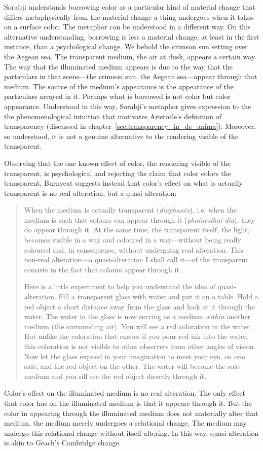Sorabji understands borrowing color as a particular kind of material change that differs metaphysically from the material change a thing undergoes when it takes on a surface color. The metaphor can be understood in a different way. On this alternative understanding, borrowing is less a material change, at least in the first instance, than a psychological change. We behold the crimson sun setting over the Aegean sea. The transparent medium, the air at dusk, appears a certain way. The way that the illuminated medium appears is due to the way that the particulars in that scene---the crimson sun, the Aegean sea---appear through that medium. The source of the medium's appearance is the appearance of the particulars arrayed in it. Perhaps what is borrowed is not color but color appearance. Understood in this way, Sorabji's metaphor gives expression to the the phenomenological intuition that motivates Aristotle's definition of transparency (discussed in chapter~\ref{sec:transparency_in_de_anima}). Moreover, so understood, it is not a genuine alternative to the rendering visible of the transparent.

Observing that the one known effect of color, the rendering visible of the transparent, is psychological and rejecting the claim that color colors the transparent, Burnyeat suggests instead that color's effect on what is actually transparent is no real alteration, but a quasi-alteration:
\begin{quotation}
	\noindent When the medium is actually transparent (\emph{diaphanēs}), i.e. when the medium is such that colours can appear through it (\emph{phainesthai dia}), they do appear through it. At the same time, the transparent itself, the light, becomes visible in a way and coloured in a way---without being really coloured and, in consequence, without undergoing real alteration. This non-real alteration---a quasi-alteration I shall call it---of the transparent consists in the fact that colours appear through it.
	
	Here is a little experiment to help you understand the idea of quasi-alteration. Fill a transparent glass with water and put it on a table. Hold a red object a short distance away from the glass and look at it through the water. The water in the glass is now serving as a medium \emph{within} another medium (the surrounding air). You will see a red coloration in the water. But unlike the coloration that ensues if you pour red ink into the water, this coloration is not visible to other observers from other angles of vision. Now let the glass expand in your imagination to meet your eye, on one side, and the red object on the other. The water will become the sole medium and you sill see the red object directly through it. \citep[425]{Burnyeat:1995fk}
\end{quotation}
Color's effect on the illuminated medium is no real alteration. The only effect that color has on the illuminated medium is that it appears through it. But the color in appearing through the illuminated medium does not materially alter that medium, the medium merely undergoes a relational change. The medium may undergo this relational change without itself altering. In this way, quasi-alteration is akin to Geach's \citeyearpar[71--72]{Geach:1969aa} Cambridge change.


